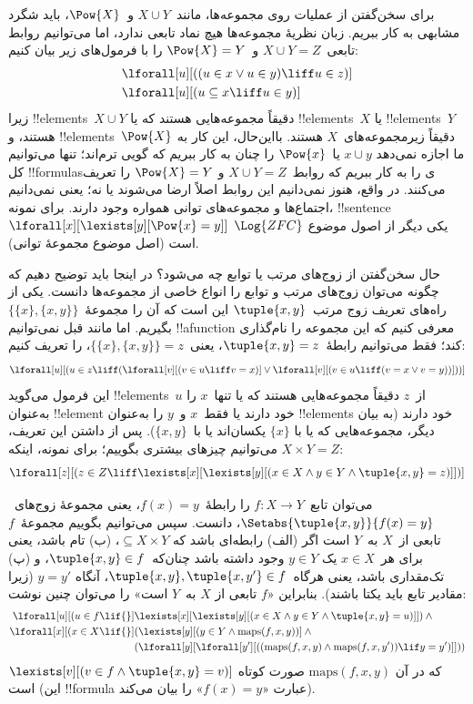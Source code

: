 \documentclass[../../../include/open-logic-section]{subfiles}
\begin{document}
برای سخن‌گفتن از عملیات روی مجموعه‌ها، مانند~$X \cup Y$ و~$\Pow{X}$،
باید شگرد مشابهی به کار ببریم. زبان نظریهٔ مجموعه‌ها هیچ نماد تابعی
ندارد، اما می‌توانیم روابط تابعی~$X \cup Y = Z$ و~$\Pow{X} = Y$ را با
فرمول‌های زیر بیان کنیم:
\begin{align*}
& \lforall[u][((u \in x \lor u \in y) \liff u \in z)]\\
& \lforall[u][(u \subseteq x \liff u \in y )]
\end{align*}
زیرا !!{element}s~$X \cup Y$ دقیقاً مجموعه‌هایی هستند که یا
!!{element}s~$X$ یا !!{element}s~$Y$ هستند، و !!{element}s~$\Pow{X}$
دقیقاً زیرمجموعه‌های~$X$ هستند. بااین‌حال، این کار به ما اجازه نمی‌دهد
$x \cup y$ یا~$\Pow{x}$ را چنان به کار ببریم که گویی ترم‌اند؛ تنها
می‌توانیم کل !!{formula}sی را به کار ببریم که روابط~$X \cup Y = Z$ و
$\Pow{X} = Y$ را تعریف می‌کنند. در واقع، هنوز نمی‌دانیم این روابط اصلاً
ارضا می‌شوند یا نه؛ یعنی نمی‌دانیم اجتماع‌ها و مجموعه‌های توانی همواره
وجود دارند. برای نمونه، !!{sentence}
$\lforall[x][\lexists[y][\Pow{x} = y]]$ یکی دیگر از اصول موضوع
$\Log{ZFC}$ است (اصل موضوع مجموعهٔ توانی).

حال سخن‌گفتن از زوج‌های مرتب یا توابع چه می‌شود؟ در اینجا باید توضیح
دهیم که چگونه می‌توان زوج‌های مرتب و توابع را انواع خاصی از مجموعه‌ها
دانست. یکی از راه‌های تعریف زوج مرتب~$\tuple{x, y}$ این است که آن را
مجموعهٔ~$\{\{x\}, \{x, y\}\}$ بگیریم. اما مانند قبل نمی‌توانیم
!!a{function} معرفی کنیم که این مجموعه را نام‌گذاری کند؛ فقط می‌توانیم
رابطهٔ~$\tuple{x, y} = z$، یعنی~$\{\{x\}, \{x, y\}\} = z$، را تعریف
کنیم:
\[
\lforall[u][(u \in z \liff (\lforall[v][(v \in u \liff v = x)] \lor
  \lforall[v][(v \in u \liff (v = x \lor v = y))]))]
\]
این فرمول می‌گوید !!{element}s~$u$ از~$z$ دقیقاً مجموعه‌هایی هستند که
یا تنها~$x$ را به‌عنوان !!{element} خود دارند یا فقط~$x$ و~$y$ را
به‌عنوان !!{element}s خود دارند (به بیان دیگر، مجموعه‌هایی که یا با
$\{x\}$ یکسان‌اند یا با~$\{x, y\}$). پس از داشتن این تعریف، می‌توانیم
چیزهای بیشتری بگوییم؛ برای نمونه، اینکه $X \times Y = Z$:
\[
\lforall[z][(z \in Z \liff \lexists[x][\lexists[y][(x \in
        X \land y \in Y \land \tuple{x, y} = z)]])]
\]

می‌توان تابع~$f \colon X \to Y$ را رابطهٔ~$f(x) = y$، یعنی مجموعهٔ
زوج‌های~$\Setabs{\tuple{x,y}}{f(x) = y}$، دانست. سپس می‌توانیم بگوییم
مجموعهٔ~$f$ تابعی از~$X$ به~$Y$ است اگر (الف) رابطه‌ای باشد که
$\subseteq X \times Y$، (ب) تام باشد، یعنی برای هر~$x \in X$ یک
$y \in Y$ وجود داشته باشد چنان‌که~$\tuple{x, y} \in f$، و (پ)
تک‌مقداری باشد، یعنی هرگاه~$\tuple{x, y}, \tuple{x, y'} \in f$، آنگاه
$y = y'$ (زیرا مقادیر تابع باید یکتا باشند). بنابراین «$f$ تابعی از
$X$ به~$Y$ است» را می‌توان چنین نوشت:
\begin{align*}
 \lforall[u][(u \in f \lif {}] & \lexists[x][\lexists[y][(x \in X \land y \in
      Y \land \tuple{x, y} = u)]]) \land {}\\
 \lforall[x][(x \in X \lif {}] &
      (\lexists[y][(y \in Y \land \mathrm{maps}(f, x, y))] \land {}\\
& (\lforall[y][\lforall[y'][((\mathrm{maps}(f, x, y) \land
    \mathrm{maps}(f, x, y')) \lif y = y')]]))
\end{align*}
که در آن $\mathrm{maps}(f, x, y)$ صورت کوتاه
$\lexists[v][(v \in f \land \tuple{x, y} = v)]$ است (این !!{formula}
عبارت «$f(x) = y$» را بیان می‌کند).
\end{document}
